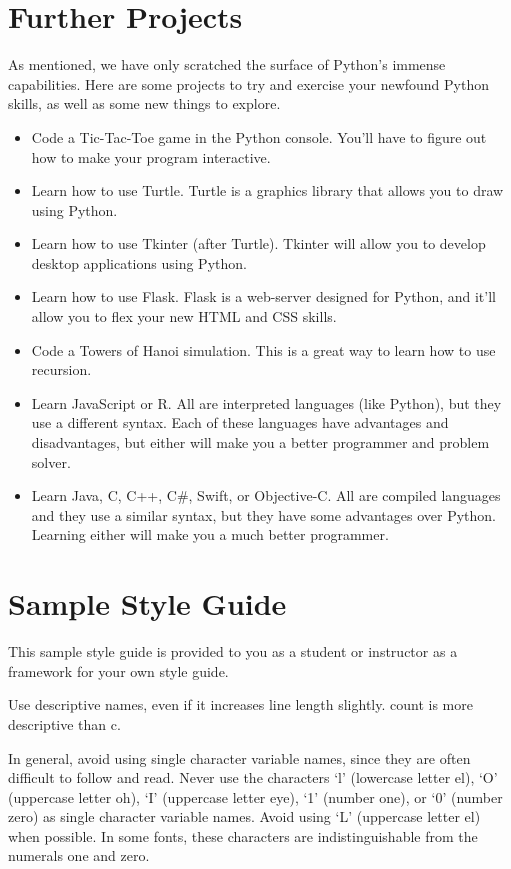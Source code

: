 \section*{Further Projects}
As mentioned, we have only scratched the surface of Python's immense capabilities. Here are some projects to try and exercise your newfound Python skills, as well as some new things to explore.
\begin{itemize}
    \item Code a Tic-Tac-Toe game in the Python console. You'll have to figure out how to make your program interactive.
    \item Learn how to use Turtle. Turtle is a graphics library that allows you to draw using Python.
    \item Learn how to use Tkinter (after Turtle). Tkinter will allow you to develop desktop applications using Python.
    \item Learn how to use Flask. Flask is a web-server designed for Python, and it'll allow you to flex your new HTML and CSS skills.
    \item Code a Towers of Hanoi simulation. This is a great way to learn how to use recursion.
    \item Learn JavaScript or R. All are interpreted languages (like Python), but they use a different syntax. Each of these languages have advantages and disadvantages, but either will make you a better programmer and problem solver.
    \item Learn Java, C, C++, C\#, Swift, or Objective-C. All are compiled languages and they use a similar syntax, but they have some advantages over Python. Learning either will make you a much better programmer.
\end{itemize}
\section*{Sample Style Guide}
This sample style guide is provided to you as a student or instructor as a framework for your own style guide.

Use descriptive names, even if it increases line length slightly. count is more descriptive than c.

In general, avoid using single character variable names, since they are often difficult to follow and read. Never use the characters ‘l’ (lowercase letter el), ‘O’ (uppercase letter oh), ‘I’ (uppercase letter eye), ‘1’ (number one), or ‘0’ (number zero) as single character variable names. Avoid using ‘L’ (uppercase letter el) when possible. In some fonts, these characters are indistinguishable from the numerals one and zero.

